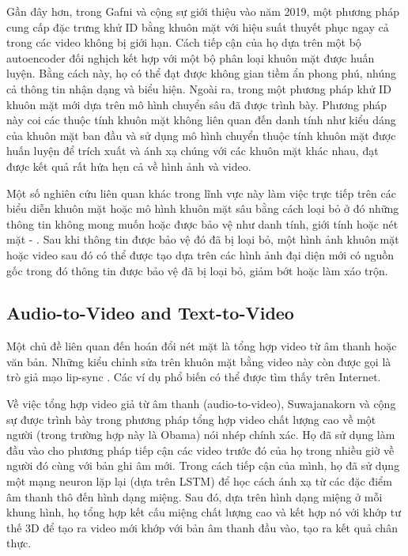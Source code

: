 \documentclass{article}
\begin{document}
Gần đây hơn, trong  Gafni và cộng sự giới thiệu vào năm 2019, một phương pháp cung cấp đặc trưng khử ID bằng khuôn mặt với hiệu suất thuyết phục ngay cả trong các video không bị giới hạn. Cách tiếp cận của họ dựa trên một bộ autoencoder đối nghịch kết hợp với một bộ phân loại khuôn mặt được huấn luyện. Bằng cách này, họ có thể đạt được không gian tiềm ẩn phong phú, nhúng cả thông tin nhận dạng và biểu hiện. Ngoài ra, trong  một phương pháp khử ID khuôn mặt mới dựa trên mô hình chuyển sâu đã được trình bày. Phương pháp này coi các thuộc tính khuôn mặt không liên quan đến danh tính như kiểu dáng của khuôn mặt ban đầu và sử dụng mô hình chuyển thuộc tính khuôn mặt được huấn luyện để trích xuất và ánh xạ chúng với các khuôn mặt khác nhau, đạt được kết quả rất hứa hẹn cả về hình ảnh và video.

Một số nghiên cứu liên quan khác trong lĩnh vực này làm việc trực tiếp trên các biểu diễn khuôn mặt hoặc mô hình khuôn mặt sâu bằng cách loại bỏ ở đó những thông tin không mong muốn hoặc được bảo vệ như danh tính, giới tính hoặc nét mặt  - . Sau khi thông tin được bảo vệ đó đã bị loại bỏ, một hình ảnh khuôn mặt hoặc video sau đó có thể được tạo dựa trên các hình ảnh đại diện mới có nguồn gốc trong đó thông tin được bảo vệ đã bị loại bỏ, giảm bớt hoặc làm xáo trộn.

\subsection{Audio-to-Video and Text-to-Video} \label{sec:7-c-atov-ttov}

Một chủ đề liên quan đến hoán đổi nét mặt là tổng hợp video từ âm thanh hoặc văn bản. Những kiểu chỉnh sửa trên khuôn mặt bằng video này còn được gọi là trò giả mạo lip-sync . Các ví dụ phổ biến có thể được tìm thấy trên Internet.

Về việc tổng hợp video giả từ âm thanh (audio-to-video), Suwajanakorn và cộng sự được trình bày trong  phương pháp tổng hợp video chất lượng cao về một người (trong trường hợp này là Obama) nói nhép chính xác. Họ đã sử dụng làm đầu vào cho phương pháp tiếp cận các video trước đó của họ trong nhiều giờ về người đó cùng với bản ghi âm mới. Trong cách tiếp cận của mình, họ đã sử dụng một mạng neuron lặp lại (dựa trên LSTM) để học cách ánh xạ từ các đặc điểm âm thanh thô đến hình dạng miệng. Sau đó, dựa trên hình dạng miệng ở mỗi khung hình, họ tổng hợp kết cấu miệng chất lượng cao và kết hợp nó với khớp tư thế 3D để tạo ra video mới khớp với bản âm thanh đầu vào, tạo ra kết quả chân thực.
\end{document}
